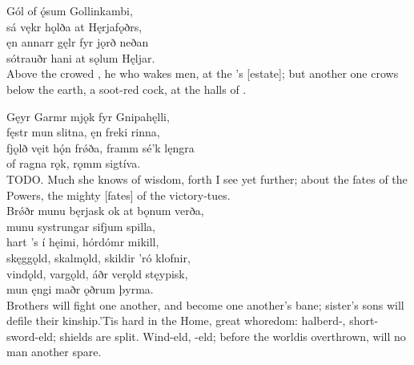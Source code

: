 \bva Gól of ǫ́sum \hld Gollinkambi, \\%
sá vękr hǫlða \hld at Hęrjafǫðrs, \\%
ęn annarr gęlr \hld fyr jǫrð neðan \\%
sótrauðr hani \hld at sǫlum Hęljar.\\%

\bvb Above the  crowed , he who wakes men, at the ’s [estate]; but another one crows below the earth, a soot-red cock, at the halls of .\footnotemark[1]\\%

\bva Gęyr Garmr mjǫk \hld fyr Gnipahęlli, \\%
fęstr mun slitna, \hld ęn freki rinna, \\%
fjǫlð vęit hǫ́n frǿða, \hld framm sé’k lęngra \\%
of ragna rǫk, \hld rǫmm sigtíva.\\%

\bvb TODO. Much she knows of wisdom, forth I see yet further; about the fates of the Powers, the mighty [fates] of the victory-tues.\\%

\bva Brǿðr munu bęrjask \hld ok at bǫnum verða, \\%
munu systrungar \hld sifjum spilla, \\%
hart ’s í hęimi, \hld hórdómr mikill, \\%
skęggǫld, skalmǫld, \hld skildir ’ró klofnir, \\%
vindǫld, vargǫld, \hld áðr verǫld stęypisk, \\%
mun ęngi maðr \hld ǫðrum þyrma.\\%

\bvb Brothers will fight one another, and become one another’s bane; sister’s sons will defile their kinship.\footnotemark[1] ’Tis hard in the Home, great whoredom: halberd-, short-sword-eld; shields are split. Wind-eld, -eld; before the world\footnotemark[2] is overthrown, will no man another spare.\\%

